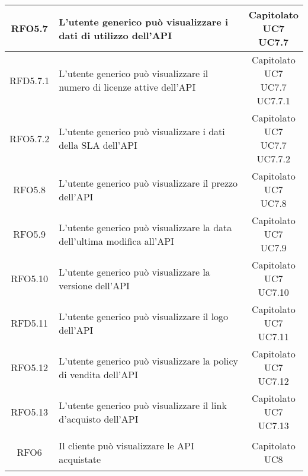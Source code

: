 \begin{longtable}{|c|p{8cm}|c|}
\hypertarget{RFO5.7}{RFO5.7} & L'utente generico può visualizzare i dati di utilizzo dell'API & \makecell*{Capitolato\\UC7\\UC7.7} \\
\hline
\hypertarget{RFD5.7.1}{RFD5.7.1} & L'utente generico può visualizzare il numero di licenze attive dell'API & \makecell*{Capitolato\\UC7\\UC7.7\\UC7.7.1} \\
\hline
\hypertarget{RFO5.7.2}{RFO5.7.2} & L'utente generico può visualizzare i dati della SLA dell'API & \makecell*{Capitolato\\UC7\\UC7.7\\UC7.7.2} \\
\hline

\hypertarget{RFO5.8}{RFO5.8} & L'utente generico può visualizzare il prezzo dell'API & \makecell*{Capitolato\\UC7\\UC7.8} \\
\hline
\hypertarget{RFO5.9}{RFO5.9} & L'utente generico può visualizzare la data dell'ultima modifica all'API & \makecell*{Capitolato\\UC7\\UC7.9} \\
\hline
\hypertarget{RFO5.10}{RFO5.10} & L'utente generico può visualizzare la versione dell'API & \makecell*{Capitolato\\UC7\\UC7.10} \\
\hline
\hypertarget{RFD5.11}{RFD5.11} & L'utente generico può visualizzare il logo dell'API & \makecell*{Capitolato\\UC7\\UC7.11} \\
\hline
\hypertarget{RFO5.12}{RFO5.12} & L'utente generico può visualizzare la policy di vendita dell'API & \makecell*{Capitolato\\UC7\\UC7.12} \\
\hline
\hypertarget{RFO5.13}{RFO5.13} & L'utente generico può visualizzare il link d'acquisto dell'API & \makecell*{Capitolato\\UC7\\UC7.13} \\
\hline

\hypertarget{RFO6}{RFO6} & Il cliente può visualizzare le API acquistate & \makecell*{Capitolato\\UC8} \\
\hline


\end{longtable}
